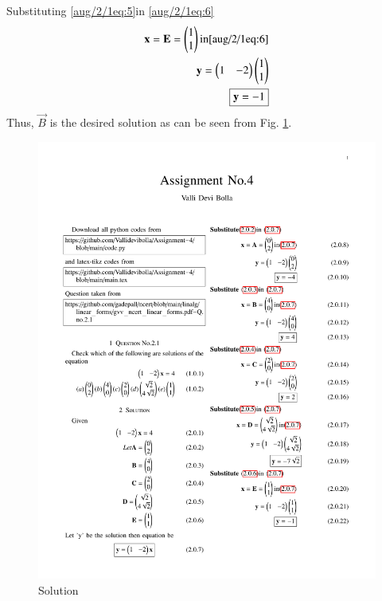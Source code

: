 Substituting \eqref{aug/2/1eq:5}in \eqref{aug/2/1eq:6}
\begin{align}
\mathbf{x}=\mathbf{E}=\begin{pmatrix}1\\1\end{pmatrix}\text{in} \eqref{aug/2/1eq:6}\\
          \mathbf{y}=\begin{pmatrix}1&-2\end{pmatrix}\begin{pmatrix}1\\1\end{pmatrix}\\
          \boxed{\mathbf{y}=-1}
\end{align}
Thus,  $\vec{B}$ is the desired solution as can be seen from Fig.     \ref{aug/2/1fig:Fig 2.1}.
\begin{figure}[!ht]
    \centering
    \includegraphics[width=\columnwidth]{solutions/aug/2/1/Assign_4 (7).pdf}
    \caption{Solution}
    \label{aug/2/1fig:Fig 2.1}
\end{figure}


